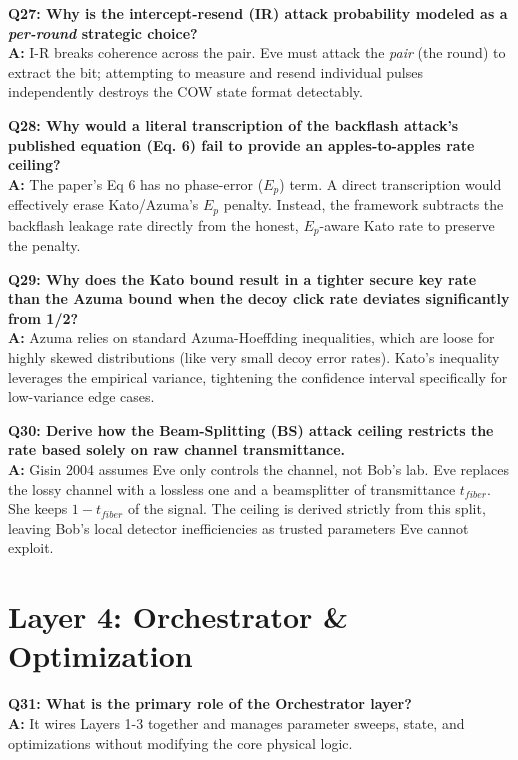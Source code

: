 \documentclass[11pt, a4paper]{article}
\begin{document}
\textbf{Q27: Why is the intercept-resend (IR) attack probability modeled as a \textit{per-round} strategic choice?} \\
\textbf{A:} I-R breaks coherence across the pair. Eve must attack the \textit{pair} (the round) to extract the bit; attempting to measure and resend individual pulses independently destroys the COW state format detectably.

\textbf{Q28: Why would a literal transcription of the backflash attack's published equation (Eq. 6) fail to provide an apples-to-apples rate ceiling?} \\
\textbf{A:} The paper's Eq 6 has no phase-error ($E_p$) term. A direct transcription would effectively erase Kato/Azuma's $E_p$ penalty. Instead, the framework subtracts the backflash leakage rate directly from the honest, $E_p$-aware Kato rate to preserve the penalty.

\textbf{Q29: Why does the Kato bound result in a tighter secure key rate than the Azuma bound when the decoy click rate deviates significantly from 1/2?} \\
\textbf{A:} Azuma relies on standard Azuma-Hoeffding inequalities, which are loose for highly skewed distributions (like very small decoy error rates). Kato's inequality leverages the empirical variance, tightening the confidence interval specifically for low-variance edge cases.

\textbf{Q30: Derive how the Beam-Splitting (BS) attack ceiling restricts the rate based solely on raw channel transmittance.} \\
\textbf{A:} Gisin 2004 assumes Eve only controls the channel, not Bob's lab. Eve replaces the lossy channel with a lossless one and a beamsplitter of transmittance $t_{fiber}$. She keeps $1-t_{fiber}$ of the signal. The ceiling is derived strictly from this split, leaving Bob's local detector inefficiencies as trusted parameters Eve cannot exploit.

\section{Layer 4: Orchestrator \& Optimization}

\textbf{Q31: What is the primary role of the Orchestrator layer?} \\
\textbf{A:} It wires Layers 1-3 together and manages parameter sweeps, state, and optimizations without modifying the core physical logic.
\end{document}
